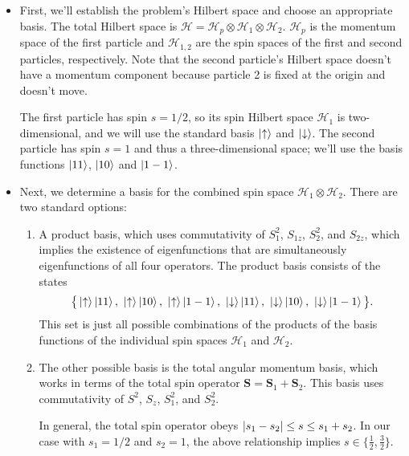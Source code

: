 \documentclass[11pt, a4paper]{article}
\renewcommand{\vec}[1]{\bm{#1}} %
\renewcommand{\H}{\mathcal{H}}  %
\newcommand{\ua}{\uparrow}  %
\newcommand{\da}{\downarrow}  %
\begin{document}
\begin{itemize}
	\item First, we'll establish the problem's Hilbert space and choose an appropriate basis. The total Hilbert space is $ \H = \H_{p} \otimes \H_{1} \otimes \H_{2} $. $ \H_{p} $ is the momentum space of the first particle and $ \H_{1,2} $  are the spin spaces of the first and second particles, respectively. Note that the second particle's Hilbert space doesn't have a momentum component because particle 2 is fixed at the origin and doesn't move.
	
	The first particle has spin $ s = 1/2 $, so its spin Hilbert space $ \H_{1} $ is two-dimensional, and we will use the standard basis $ \ket{\ua} $ and $ \ket{\da} $. The second particle has spin $ s = 1 $ and thus a three-dimensional space; we'll use the basis functions $ \ket{11} $, $ \ket{10} $ and $ \ket{1-1} $.
	
	\item Next, we determine a basis for the combined spin space $ \H_{1} \otimes \H_{2} $. There are two standard options:
	\begin{enumerate}
		\item A product basis, which uses commutativity of $ S_{1}^{2} $, $ S_{1z} $, $ S_{2}^{2} $, and $ S_{2z} $, which implies the existence of eigenfunctions that are simultaneously eigenfunctions of all four operators. The product basis consists of the states 
		\begin{equation*}
			\big\{\ket{\ua}\ket{11},\ \ket{\ua}\ket{10},\ \ket{\ua}\ket{1-1},\ \ket{\da}\ket{11},\ \ket{\da}\ket{10},\ \ket{\da}\ket{1-1}   \big\}.
		\end{equation*}
		This set is just all possible combinations of the products of the basis functions of the individual spin spaces $ \H_{1} $ and $ \H_{2} $.
		
		\item The other possible basis is the total angular momentum basis, which works in terms of the total spin operator $ \vec{S} = \vec{S}_{1} + \vec{S}_{2} $. This basis uses commutativity of $ S^{2} $, $ S_{z} $, $ S_{1}^{2} $, and $ S_{2}^{2} $.
			
		In general, the total spin operator obeys $ \abs{s_{1} - s_{2}} \leq s \leq s_{1} + s_{2} $. In our case with $ s_{1} = 1/2 $  and $ s_{2} = 1 $, the above relationship implies $ s \in \big\{ \frac{1}{2}, \frac{3}{2} \big\} $.
			

\end{enumerate}
\end{itemize}
\end{document}
